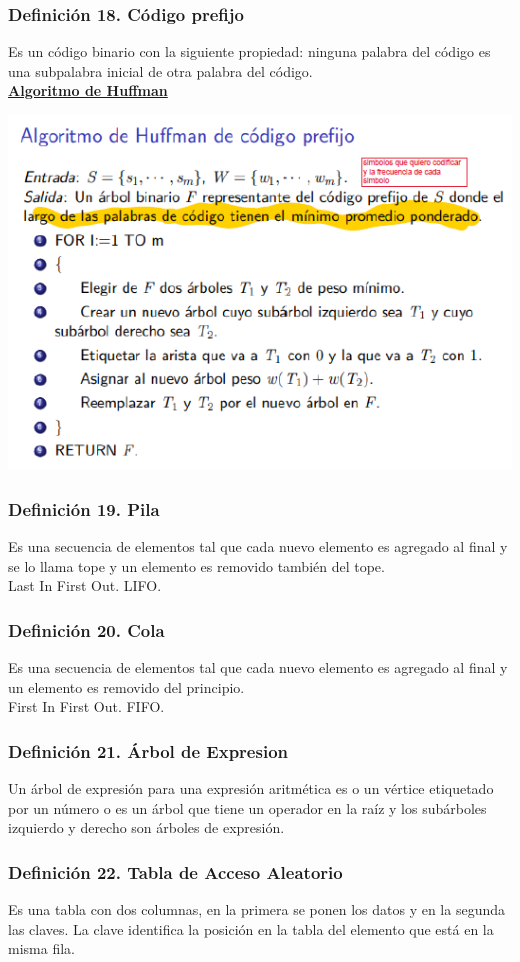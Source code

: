 \documentclass{article}
\newcommand{\bld}[1]{\textbf{#1}}
\begin{document}
\subsubsection*{Definición 18. Código prefijo}
Es un código binario con la siguiente propiedad: ninguna palabra del código es una subpalabra inicial de otra palabra del código.
\\\underline{\bld{Algoritmo de Huffman}}
\begin{center}
    \includegraphics[width=.60\textwidth]{algHuffman.PNG}
\end{center}

\subsubsection*{Definición 19. Pila}
Es una secuencia de elementos tal que cada nuevo elemento es agregado al final y se lo llama tope y un elemento es removido también del tope.
\\Last In First Out. LIFO.

\subsubsection*{Definición 20. Cola}
Es una secuencia de elementos tal que cada nuevo elemento es agregado al final y un elemento es removido del principio.
\\First In First Out. FIFO.

\subsubsection*{Definición 21. Árbol de Expresion}
Un árbol de expresión para una expresión aritmética es o un vértice etiquetado por un número o es un árbol que tiene un operador en la
raíz y los subárboles izquierdo y derecho son árboles de expresión.

\subsubsection*{Definición 22. Tabla de Acceso Aleatorio}
Es una tabla con dos columnas, en la primera se ponen los datos y en la segunda las claves.
La clave identifica la posición en la tabla del elemento que está en la misma fila.
\end{document}
